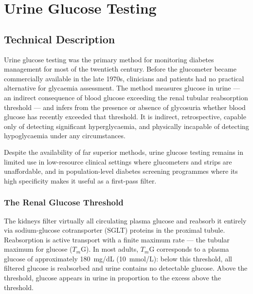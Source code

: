 \chapter{Urine Glucose Testing}
\label{ch:urine}

\section{Technical Description}

Urine glucose testing was the primary method for monitoring diabetes management for most of the twentieth century. Before the glucometer became commercially available in the late 1970s, clinicians and patients had no practical alternative for glycaemia assessment. The method measures glucose in urine --- an indirect consequence of blood glucose exceeding the renal tubular reabsorption threshold --- and infers from the presence or absence of glycosuria whether blood glucose has recently exceeded that threshold. It is indirect, retrospective, capable only of detecting significant hyperglycaemia, and physically incapable of detecting hypoglycaemia under any circumstances.

Despite the availability of far superior methods, urine glucose testing remains in limited use in low-resource clinical settings where glucometers and strips are unaffordable, and in population-level diabetes screening programmes where its high specificity makes it useful as a first-pass filter.

\subsection*{The Renal Glucose Threshold}

The kidneys filter virtually all circulating plasma glucose and reabsorb it entirely via sodium-glucose cotransporter (SGLT) proteins in the proximal tubule. Reabsorption is active transport with a finite maximum rate --- the tubular maximum for glucose ($T_m$G). In most adults, $T_m$G corresponds to a plasma glucose of approximately 180~mg/dL (10~mmol/L): below this threshold, all filtered glucose is reabsorbed and urine contains no detectable glucose. Above the threshold, glucose appears in urine in proportion to the excess above the threshold.


